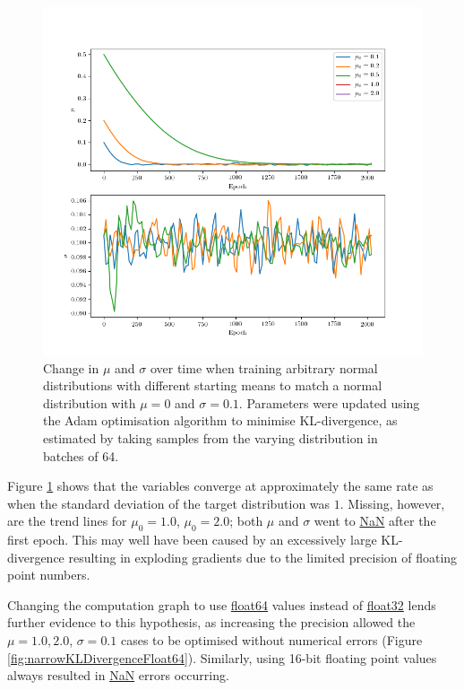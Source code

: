 \documentclass[../../main.tex]{subfiles}
\begin{document}
\begin{figure}
    \begin{center}
    \includegraphics[width=\textwidth]{narrowKLDivergence}
    \caption{
        Change in $\mu$ and $\sigma$ over time when training arbitrary normal distributions with different starting means to match a normal distribution with $\mu=0$ and $\sigma=0.1$. 
        Parameters were updated using the Adam optimisation algorithm to minimise KL-divergence, as estimated by taking samples from the varying distribution in batches of 64.
    }
    \label{fig:narrowKLDivergence}
    \end{center}
\end{figure}

Figure \ref{fig:narrowKLDivergence} shows that the variables converge at approximately the same rate as when the standard deviation of the target distribution was $1$.
Missing, however, are the trend lines for $\mu_0=1.0$, $\mu_0=2.0$; both $\mu$ and $\sigma$ went to \url{NaN} after the first epoch.
This may well have been caused by an excessively large KL-divergence resulting in exploding gradients due to the limited precision of floating point numbers.

Changing the computation graph to use \url{float64} values instead of \url{float32} lends further evidence to this hypothesis, as increasing the precision allowed the $\mu=1.0, 2.0$, $\sigma=0.1$ cases to be optimised without numerical errors (Figure \ref{fig:narrowKLDivergenceFloat64}).
Similarly, using 16-bit floating point values always resulted in \url{NaN} errors occurring.
\end{document}

